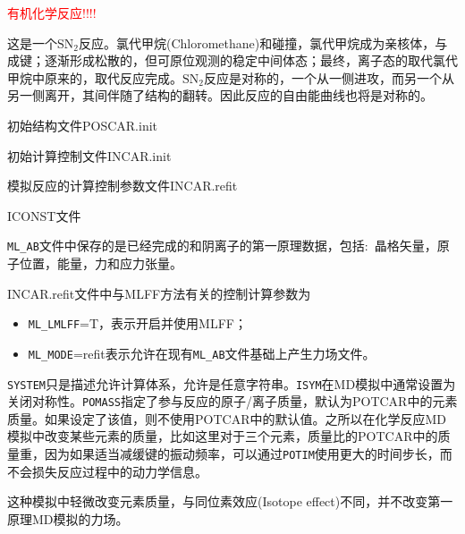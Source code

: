 \textcolor{red}{\huge 有机化学反应!!!!}

这是一个$\textrm{SN}_2$反应。氯代甲烷\textrm{(Chloromethane)}和碰撞，氯代甲烷成为亲核体，与成键；逐渐形成松散的，但可原位观测的稳定中间体态；最终，离子态的取代氯代甲烷中原来的，取代反应完成。$\mathrm{SN}_2$反应是对称的，一个从一侧进攻，而另一个从另一侧离开，其间伴随了结构的翻转。因此反应的自由能曲线也将是对称的。

初始结构文件\textrm{POSCAR.init}

初始计算控制文件\textrm{INCAR.init}

模拟反应的计算控制参数文件\textrm{INCAR.refit}

\textrm{ICONST}文件

\texttt{ML\_AB}文件中保存的是已经完成的和阴离子的第一原理数据，包括:~晶格矢量，原子位置，能量，力和应力张量。

\textrm{INCAR.refit}文件中与\textrm{MLFF}方法有关的控制计算参数为
\begin{itemize}
	\item \texttt{ML\_LMLFF}=\textrm{T}，表示开启并使用\textrm{MLFF}；
	\item \texttt{ML\_MODE}=\textrm{refit}表示允许在现有\texttt{ML\_AB}文件基础上产生力场文件。
\end{itemize}

\texttt{SYSTEM}只是描述允许计算体系，允许是任意字符串。\texttt{ISYM}在\textrm{MD}模拟中通常设置为关闭对称性。\texttt{POMASS}指定了参与反应的原子/离子质量，默认为\textrm{POTCAR}中的元素质量。如果设定了该值，则不使用\textrm{POTCAR}中的默认值。之所以在化学反应\textrm{MD}模拟中改变某些元素的质量，比如这里对于三个元素，质量比的\textrm{POTCAR}中的质量重，因为如果适当减缓键的振动频率，可以通过\texttt{POTIM}使用更大的时间步长，而不会损失反应过程中的动力学信息。

这种模拟中轻微改变元素质量，与同位素效应\textrm{(Isotope effect)}不同，并不改变第一原理\textrm{MD}模拟的力场。


